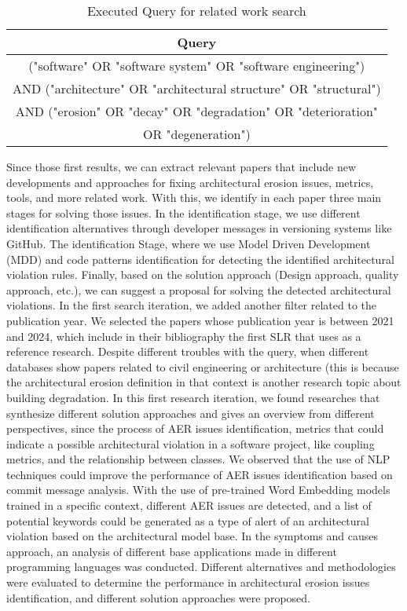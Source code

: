 \begin{table}[H]
    \centering
    \begin{tabular}{|c|}
        \hline
        Query\\
         \hline
             ("software" OR "software system" OR "software engineering") \\
             AND ("architecture" OR "architectural structure" OR "structural") \\
             AND ("erosion" OR "decay" OR "degradation" OR "deterioration"\\
             OR "degeneration") \\
         \hline
    \end{tabular}
    \caption{Executed Query for related work search}
    \label{tab:my_label}
\end{table}

Since those first results, we can extract relevant papers that include new developments and approaches for fixing architectural erosion issues, metrics, tools, and more related work. With this, we identify in each paper three main stages for solving those issues. In the identification stage, we use different identification alternatives through developer messages in versioning systems like GitHub. The identification Stage, where we use Model Driven Development (MDD) and code patterns identification for detecting the identified architectural violation rules. Finally, based on the solution approach (Design approach, quality approach, etc.), we can suggest a proposal for solving the detected architectural violations.
In the first search iteration, we added another filter related to the publication year. We selected the papers whose publication year is between 2021 and 2024, which include in their bibliography the first SLR that uses as a reference research. Despite different troubles with the query, when different databases show papers related to civil engineering or architecture (this is because the architectural erosion definition in that context is another research topic about building degradation. In this first research iteration, we found researches that synthesize different solution approaches and gives an overview from different perspectives, since the process of AER issues identification, metrics that could indicate a possible architectural violation in a software project, like coupling metrics, and the relationship between classes.
We observed that the use of NLP techniques could improve the performance of AER issues identification based on commit message analysis. With the use of pre-trained Word Embedding models trained in a specific context, different AER issues are detected, and a list of potential keywords could be generated as a type of alert of an architectural violation based on the architectural model base.
In the symptoms and causes approach, an analysis of different base applications made in different programming languages was conducted. Different alternatives and methodologies were evaluated to determine the performance in architectural erosion issues identification, and different solution approaches were proposed.

